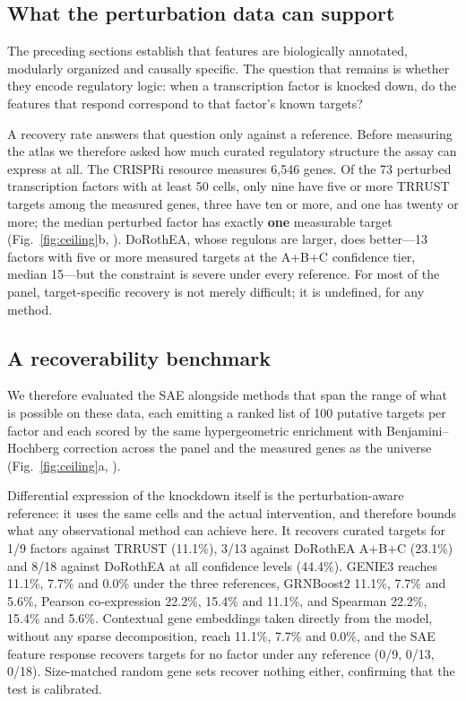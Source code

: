 \subsection*{What the perturbation data can support}
\label{sec:evaluability}

The preceding sections establish that features are biologically annotated, modularly organized and
causally specific. The question that remains is whether they encode regulatory logic: when a
transcription factor is knocked down, do the features that respond correspond to that factor's
known targets?

A recovery rate answers that question only against a reference. Before measuring the atlas we
therefore asked how much curated regulatory structure the assay can express at all. The CRISPRi
resource measures 6,546 genes. Of the 73 perturbed transcription factors with at least 50 cells,
only nine have five or more TRRUST targets among the measured genes, three have ten or more, and
one has twenty or more; the median perturbed factor has exactly \textbf{one} measurable target
(Fig.~\ref{fig:ceiling}b, ). DoRothEA, whose regulons are larger, does
better---13 factors with five or more measured targets at the A+B+C confidence tier, median 15---but
the constraint is severe under every reference. For most of the panel, target-specific recovery is
not merely difficult; it is undefined, for any method.

\subsection*{A recoverability benchmark}
\label{sec:ceiling}

We therefore evaluated the SAE alongside methods that span the range of what is possible on these
data, each emitting a ranked list of 100 putative targets per factor and each scored by the same
hypergeometric enrichment with Benjamini--Hochberg correction across the panel and the measured
genes as the universe (Fig.~\ref{fig:ceiling}a, ).

Differential expression of the knockdown itself is the perturbation-aware reference: it uses the
same cells and the actual intervention, and therefore bounds what any observational method can
achieve here. It recovers curated targets for 1/9 factors against TRRUST (11.1\%), 3/13 against
DoRothEA A+B+C (23.1\%) and 8/18 against DoRothEA at all confidence levels (44.4\%). GENIE3 reaches
11.1\%, 7.7\% and 0.0\% under the three references, GRNBoost2 11.1\%, 7.7\% and 5.6\%, Pearson
co-expression 22.2\%, 15.4\% and 11.1\%, and Spearman 22.2\%, 15.4\% and 5.6\%. Contextual gene
embeddings taken directly from the model, without any sparse decomposition, reach 11.1\%, 7.7\% and
0.0\%, and the SAE feature response recovers targets for no factor under any reference (0/9, 0/13,
0/18). Size-matched random gene sets recover nothing either, confirming that the test is
calibrated.

